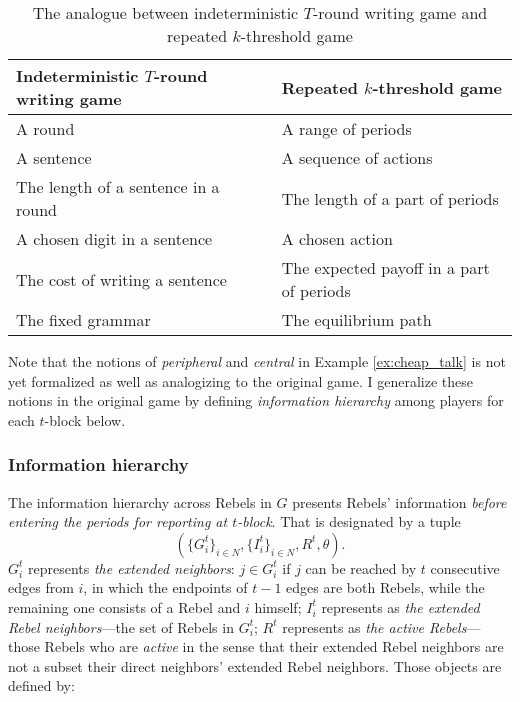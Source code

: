 \documentclass[12pt,letter]{article}
\theoremstyle{definition}
\theoremstyle{remark}
\theoremstyle{claim}
\begin{document}
\begin{table}[!htbp]
\caption{The analogue between indeterministic $T$-round writing game and repeated $k$-threshold game}
\label{table:analogue}
\begin{center}
\begin{tabular}{ll }
Indeterministic $T$-round writing game & Repeated $k$-threshold game \\
\hline
\hline
A round & A range of periods\\
A sentence & A sequence of actions \\
The length of a sentence in a round & The length of a part of periods\\
A chosen digit in a sentence & A chosen action\\
The cost of writing a sentence & The expected payoff in a part of periods\\
The fixed grammar & The equilibrium path\\
\hline
\end{tabular}
\end{center}

\end{table}



Note that the notions of \textit{peripheral} and \textit{central} in Example \ref{ex:cheap_talk} is not yet formalized as well as analogizing to the original game. I generalize these notions in the original game by defining \textit{information hierarchy} among players for each $t$-block below.


\subsubsection{Information hierarchy}
\label{sec:info}
The information hierarchy across Rebels in $G$ presents Rebels' information \textit{before entering the periods for reporting at $t$-block}. That is designated by a tuple \[(\{G^{t}_i\}_{i\in N}, \{I^{t}_i\}_{i\in N}, R^t,\theta).\]
$G^{t}_i$ represents \textit{the extended neighbors}: $j\in G^{t}_i$ if $j$ can be reached by $t$ consecutive edges from $i$, in which the endpoints of $t-1$ edges are both Rebels, while the remaining one consists of a Rebel and $i$ himself; $I^{t}_i$ represents as \textit{the extended Rebel neighbors}---the set of Rebels in $G^t_i$; $R^t$ represents as \textit{the active Rebels}---those Rebels who are \textit{active} in the sense that their extended Rebel neighbors are not a subset their direct neighbors' extended Rebel neighbors. Those objects are defined by:
\end{document}
